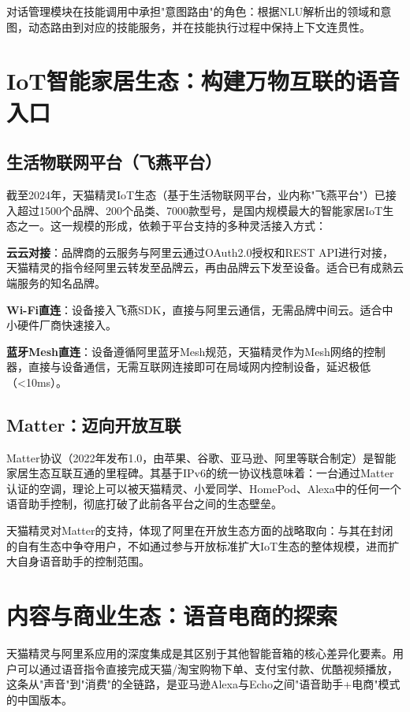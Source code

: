 \documentclass[12pt, a4paper, twoside, openright]{book}
\begin{document}
对话管理模块在技能调用中承担"意图路由"的角色：根据NLU解析出的领域和意图，动态路由到对应的技能服务，并在技能执行过程中保持上下文连贯性。

\section{IoT智能家居生态：构建万物互联的语音入口}

\subsection{生活物联网平台（飞燕平台）}

截至2024年，天猫精灵IoT生态（基于生活物联网平台，业内称"飞燕平台"）已接入超过1500个品牌、200个品类、7000款型号，是国内规模最大的智能家居IoT生态之一。这一规模的形成，依赖于平台支持的多种灵活接入方式：

\textbf{云云对接}：品牌商的云服务与阿里云通过OAuth2.0授权和REST API进行对接，天猫精灵的指令经阿里云转发至品牌云，再由品牌云下发至设备。适合已有成熟云端服务的知名品牌。

\textbf{Wi-Fi直连}：设备接入飞燕SDK，直接与阿里云通信，无需品牌中间云。适合中小硬件厂商快速接入。

\textbf{蓝牙Mesh直连}：设备遵循阿里蓝牙Mesh规范，天猫精灵作为Mesh网络的控制器，直接与设备通信，无需互联网连接即可在局域网内控制设备，延迟极低（<10ms）。

\subsection{Matter：迈向开放互联}

Matter协议（2022年发布1.0，由苹果、谷歌、亚马逊、阿里等联合制定）是智能家居生态互联互通的里程碑。其基于IPv6的统一协议栈意味着：一台通过Matter认证的空调，理论上可以被天猫精灵、小爱同学、HomePod、Alexa中的任何一个语音助手控制，彻底打破了此前各平台之间的生态壁垒。

天猫精灵对Matter的支持，体现了阿里在开放生态方面的战略取向：与其在封闭的自有生态中争夺用户，不如通过参与开放标准扩大IoT生态的整体规模，进而扩大自身语音助手的控制范围。

\section{内容与商业生态：语音电商的探索}

天猫精灵与阿里系应用的深度集成是其区别于其他智能音箱的核心差异化要素。用户可以通过语音指令直接完成天猫/淘宝购物下单、支付宝付款、优酷视频播放，这条从"声音"到"消费"的全链路，是亚马逊Alexa与Echo之间"语音助手+电商"模式的中国版本。
\end{document}
